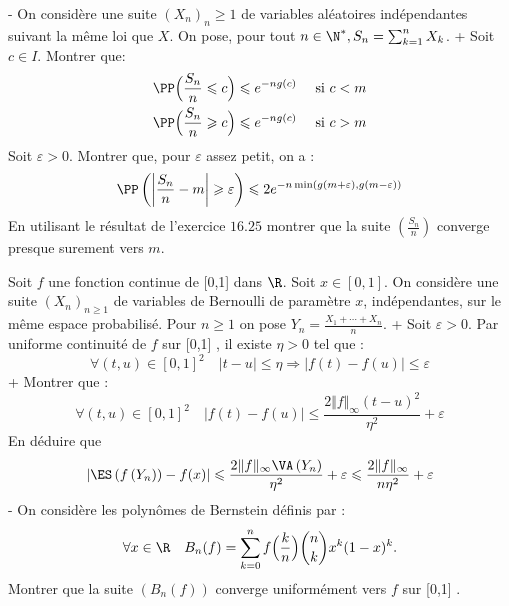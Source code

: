 \begin{exercise}[title=Fonction génératrice des moments]
\question- On considère une suite $\left(X_{n}\right)_{n} \geqslant 1$ de variables aléatoires indépendantes suivant la même loi que $X$. On pose, pour tout $n \in \N^{*}, S_{n}=\sum_{k=1}^{n} X_{k}$.
\question+ Soit $c \in I $. Montrer que:
\begin{equation*}\aligned
\PP\Big(\frac{S_{n}}{n} &\leqslant c\Big) \leqslant e^{-n g(c)} && \text { si }  c<m \\
\PP\Big(\frac{S_{n}}{n} &\geqslant c\Big) \leqslant e^{-n g(c)} && \text { si }  c>m
\endaligned
\end{equation*}
\question Soit $\varepsilon>0$. Montrer que, pour $\varepsilon$ assez petit, on a :
\begin{equation*}
\PP\left(\left|\frac{S_{n}}{n}-m\right| \geqslant \varepsilon\right) \leqslant 2 e^{-n \min (g(m+\varepsilon), g(m-\varepsilon))}
\end{equation*}
\question En utilisant le résultat de l'exercice $16.25$ montrer que la suite $\left(\frac{S_{n}}{n}\right)$ converge presque surement vers $m$.

\endquestions 
\end{exercise}


\begin{exercise}[title=Théorème de Weierstrass]
Soit $f$ une fonction continue de [0,1] dans $\R $. Soit $x \in[0,1] $. On considère une suite $\left(X_{n}\right)_{n \geqslant 1}$ de variables de Bernoulli de paramètre $x$, indépendantes, sur le même espace probabilisé. Pour $n \geqslant 1$ on pose $Y_{n}=\frac{X_{1}+\cdots+X_{n}}{n}$.
\question+ Soit $\varepsilon>0$. Par uniforme continuité de $f$ sur [0,1] , il existe $\eta>0$ tel que :
\begin{equation*}
\forall(t, u) \in[0,1]^{2} \quad|t-u| \leqslant \eta \Longrightarrow|f(t)-f(u)| \leqslant \varepsilon
\end{equation*}
\question+ Montrer que :
\begin{equation*}
\forall(t, u) \in[0,1]^{2} \quad|f(t)-f(u)| \leqslant \frac{2\Vert f\Vert _{\infty}(t-u)^{2}}{\eta^{2}}+\varepsilon
\end{equation*}
\question En déduire que
\begin{equation*}
\left|\ES\left(f\left(Y_{n}\right)\right)-f(x)\right| \leqslant \frac{2\Vert f\Vert _{\infty} \VA\left(Y_{n}\right)}{\eta^{2}}+\varepsilon \leqslant \frac{2\Vert f\Vert _{\infty}}{n \eta^{2}}+\varepsilon
\end{equation*}
\question- On considère les polynômes de Bernstein définis par :
\begin{equation*}
\forall x \in \R \quad B_{n}(f)=\sum_{k=0}^{n} f\Big(\frac kn\Big)\binom nk x^{k}(1-x)^{k} .
\end{equation*}
Montrer que la suite $\left(B_{n}(f)\right)$ converge uniformément vers $f$ sur [0,1] .
\endquestions 
\end{exercise}


